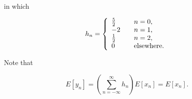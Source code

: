 \documentclass[11pt,titlepage]{report}
\begin{document}
in which

\begin{equation}
	h_n = \left\{
	\begin{array}{l l}
		\frac{5}{2} & \quad n = 0, \\
		-2 & \quad n = 1, \\
		\frac{1}{2} & \quad n = 2, \\
		0 & \quad \text{elsewhere}.
	\end{array}
	\right.
\end{equation}

Note that

\begin{equation}
	E[y_n] = \left( \sum_{n=-\infty}^{\infty} h_n \right) E[x_n] = E[x_n].
\end{equation}
\end{document}

